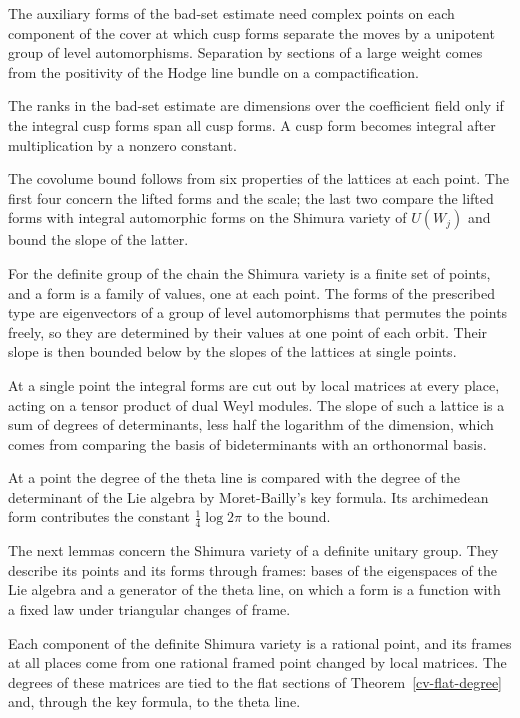 The auxiliary forms of the bad-set estimate need complex points on each component of the cover at which cusp
forms separate the moves by a unipotent group of level automorphisms. Separation by sections of a large weight
comes from the positivity of the Hodge line bundle on a compactification.

The ranks in the bad-set estimate are dimensions over the coefficient field only if the integral cusp forms
span all cusp forms. A cusp form becomes integral after multiplication by a nonzero constant.

The covolume bound follows from six properties of the lattices at each point. The first
four concern the lifted forms and the scale; the last two compare the lifted forms with
integral automorphic forms on the Shimura variety of $U(W_j)$ and bound the slope of the
latter.

For the definite group of the chain the Shimura variety is a finite set of points, and a form is a
family of values, one at each point. The forms of the prescribed type are eigenvectors of a group of
level automorphisms that permutes the points freely, so they are determined by their values at one
point of each orbit. Their slope is then bounded below by the slopes of the lattices at single points.

At a single point the integral forms are cut out by local matrices at every place, acting on a tensor
product of dual Weyl modules. The slope of such a lattice is a sum of degrees of determinants, less
half the logarithm of the dimension, which comes from comparing the basis of bideterminants with an
orthonormal basis.

At a point the degree of the theta line is compared with the degree of the determinant of the Lie
algebra by Moret-Bailly's key formula. Its archimedean form contributes the constant
$\frac14\log2\pi$ to the bound.

The next lemmas concern the Shimura variety of a definite unitary group. They describe its points and
its forms through frames: bases of the eigenspaces of the Lie algebra and a generator of the theta
line, on which a form is a function with a fixed law under triangular changes of frame.

Each component of the definite Shimura variety is a rational point, and its frames at all places
come from one rational framed point changed by local matrices. The degrees of these matrices are tied
to the flat sections of Theorem~\ref{cv-flat-degree} and, through the key formula, to the theta line.

